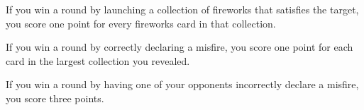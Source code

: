 \documentclass[a6paper, 12pt, parskip=half, DIV=14]{scrartcl}
\begin{document}
If you win a round by launching a collection of fireworks that satisfies the target, you score one point for every fireworks card in that collection.

If you win a round by correctly declaring a misfire, you score one point for each card in the largest collection you revealed.

If you win a round by having one of your opponents incorrectly declare a misfire, you score three points. 
 \newpage
\phantom{SkyFire}
\end{document}
